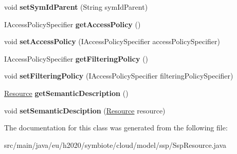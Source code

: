 \begin{DoxyCompactItemize}
\item 
\mbox{\label{classeu_1_1h2020_1_1symbiote_1_1cloud_1_1model_1_1ssp_1_1SspResource_aaab32fe3db9e01c80e363df4d19537fa}} 
void {\bfseries set\+Sym\+Id\+Parent} (String sym\+Id\+Parent)
\item 
\mbox{\label{classeu_1_1h2020_1_1symbiote_1_1cloud_1_1model_1_1ssp_1_1SspResource_acb50622f38f05a0b4979577ebec82fa0}} 
I\+Access\+Policy\+Specifier {\bfseries get\+Access\+Policy} ()
\item 
\mbox{\label{classeu_1_1h2020_1_1symbiote_1_1cloud_1_1model_1_1ssp_1_1SspResource_a4a750d4c702bee4aa09b45b79855f68a}} 
void {\bfseries set\+Access\+Policy} (I\+Access\+Policy\+Specifier access\+Policy\+Specifier)
\item 
\mbox{\label{classeu_1_1h2020_1_1symbiote_1_1cloud_1_1model_1_1ssp_1_1SspResource_a64114655cf2d718a408b5e8f94c24e05}} 
I\+Access\+Policy\+Specifier {\bfseries get\+Filtering\+Policy} ()
\item 
\mbox{\label{classeu_1_1h2020_1_1symbiote_1_1cloud_1_1model_1_1ssp_1_1SspResource_a19a384952fada0471037bae7d5638941}} 
void {\bfseries set\+Filtering\+Policy} (I\+Access\+Policy\+Specifier filtering\+Policy\+Specifier)
\item 
\mbox{\label{classeu_1_1h2020_1_1symbiote_1_1cloud_1_1model_1_1ssp_1_1SspResource_a151f1a14b074a4c9ecc80860e7aabaca}} 
\hyperlink{classeu_1_1h2020_1_1symbiote_1_1model_1_1cim_1_1Resource}{Resource} {\bfseries get\+Semantic\+Description} ()
\item 
\mbox{\label{classeu_1_1h2020_1_1symbiote_1_1cloud_1_1model_1_1ssp_1_1SspResource_a9d1c03dd7203b1e6235b139d05784c32}} 
void {\bfseries set\+Semantic\+Desciption} (\hyperlink{classeu_1_1h2020_1_1symbiote_1_1model_1_1cim_1_1Resource}{Resource} resource)
\end{DoxyCompactItemize}


The documentation for this class was generated from the following file\+:\begin{DoxyCompactItemize}
\item 
src/main/java/eu/h2020/symbiote/cloud/model/ssp/Ssp\+Resource.\+java\end{DoxyCompactItemize}
